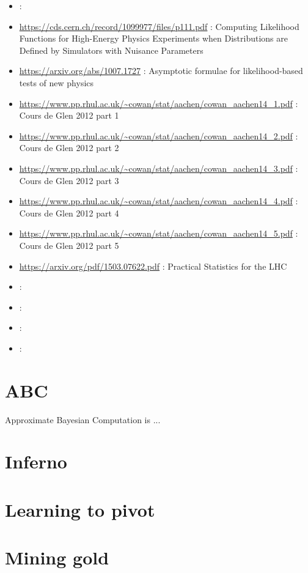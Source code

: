 \begin{itemize}
    \item \url{} : 
    \item \url{https://cds.cern.ch/record/1099977/files/p111.pdf} : Computing Likelihood Functions for High-Energy Physics Experiments when Distributions are Defined by Simulators with Nuisance Parameters
    \item \url{https://arxiv.org/abs/1007.1727} : Asymptotic formulae for likelihood-based tests of new physics
    \item \url{https://www.pp.rhul.ac.uk/~cowan/stat/aachen/cowan_aachen14_1.pdf} : Cours de Glen 2012 part 1
    \item \url{https://www.pp.rhul.ac.uk/~cowan/stat/aachen/cowan_aachen14_2.pdf} : Cours de Glen 2012 part 2
    \item \url{https://www.pp.rhul.ac.uk/~cowan/stat/aachen/cowan_aachen14_3.pdf} : Cours de Glen 2012 part 3
    \item \url{https://www.pp.rhul.ac.uk/~cowan/stat/aachen/cowan_aachen14_4.pdf} : Cours de Glen 2012 part 4
    \item \url{https://www.pp.rhul.ac.uk/~cowan/stat/aachen/cowan_aachen14_5.pdf} : Cours de Glen 2012 part 5
    \item \url{https://arxiv.org/pdf/1503.07622.pdf} : Practical Statistics for the LHC
    \item \url{} : 
    \item \url{} : 
    \item \url{} : 
    \item \url{} : 
\end{itemize}


\section{ ABC }

Approximate Bayesian Computation is ...

\section{ Inferno }
\section{ Learning to pivot}

\section{ Mining gold }

